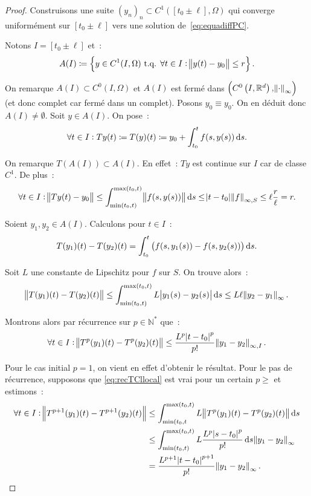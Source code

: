 \documentclass{report}
\theoremstyle{definition}
\theoremstyle{remark}
\numberwithin{equation}{section}
\newcommand{\R}{\mathbb R}
\newcommand{\N}{\mathbb N}
\newcommand{\Ns}{\N^{*}}
\newcommand{\tq}{\text{ t.q. }}
\newcommand{\evfn}[3]{\left(#1\left(#2, #3\right), \norm {\cdot}_{\infty}\right)}
\newcommand{\evnC}[3]{{\evfn {C^{#1}}{#2}{#3}}}
\begin{document}
			\begin{proof} Construisons une suite $(y_n)_n \subset C^1([t_0 \pm \ell], \Omega)$ qui converge uniformément sur $[t_0 \pm \ell]$ vers une solution
			de~\eqref{eq:equadiffPC}.

			Notons $I = [t_0 \pm \ell]$ et~:
			\begin{equation}
				A(I) \coloneqq \left\{y \in C^1(I, \Omega) \tq \forall t \in I : \norm {y(t) - y_0} \leq r\right\}.
			\end{equation}

			On remarque $A(I) \subset C^0(I, \Omega)$ et $A(I)$ est fermé dans $\evnC0I{\R^d}$ (et donc complet car fermé dans un complet). Posons
			$y_0 \equiv y_0$\footnotemark. On en déduit donc
			$A(I) \neq \emptyset$. Soit $y \in A(I)$. On pose~:
			\begin{equation}
				\forall t \in I : Ty(t) \coloneqq T(y)(t) \coloneqq y_0 + \int_{t_0}^tf(s, y(s))\dif s.
			\end{equation}

			On remarque $T(A(I)) \subset A(I)$. En effet~: $Ty$ est continue sur $I$ car de classe $C^1$. De plus~:
			\begin{equation}
				\forall t \in I : \norm {Ty(t) - y_0} \leq \int_{\min(t_0, t)}^{\max(t_0, t)}\norm {f(s, y(s))}\dif s \leq \abs {t-t_0}\norm f_{\infty, S}
				\leq \ell\frac r\ell = r.
			\end{equation}

			Soient $y_1, y_2 \in A(I)$. Calculons pour $t \in I$~:
			\begin{equation}
				T(y_1)(t) - T(y_2)(t) = \int_{t_0}^t\left(f(s, y_1(s)) - f(s, y_2(s))\right)\dif s.
			\end{equation}

			Soit $L$ une constante de Lipschitz pour $f$ sur $S$. On trouve alors~:
			\begin{equation}
				\norm {T(y_1)(t) - T(y_2)(t)} \leq \int_{\min(t_0, t)}^{\max(t_0, t)}L\abs {y_1(s)-y_2(s)}\dif s \leq L\ell\norm {y_2-y_1}_\infty.
			\end{equation}

			Montrons alors par récurrence sur $p \in \Ns$ que~:
			\begin{align}\label{eq:recTCllocal}
				\forall t \in I : \norm {T^p(y_1)(t) - T^p(y_2)(t)} \leq \frac {L^p\abs {t-t_0}^p}{p!}\norm {y_1-y_2}_{\infty, I}.
			\end{align}

			Pour le cas initial $p=1$, on vient en effet d'obtenir le résultat. Pour le pas de récurrence, supposons que \eqref{eq:recTCllocal} est vrai pour un
			certain $p \geq $ et estimons~:
			\begin{align}
				\forall t \in I : \norm {T^{p+1}(y_1)(t) - T^{p+1}(y_2)(t)} &\leq \int_{\min(t_0, t}^{\max(t_0, t)}L\norm {T^p(y_1)(t) - T^p(y_2)(t)}\dif s \\
				&\leq \int_{\min(t_0, t)}^{\max(t_0, t)}L\frac {L^p\abs {s-t_0}^p}{p!}\dif s\norm {y_1-y_2}_\infty \\
				&= \frac {L^{p+1}\abs {t-t_0}^{p+1}}{p!}\norm {y_1-y_2}_\infty.
			\end{align}


\end{proof}
\end{document}
